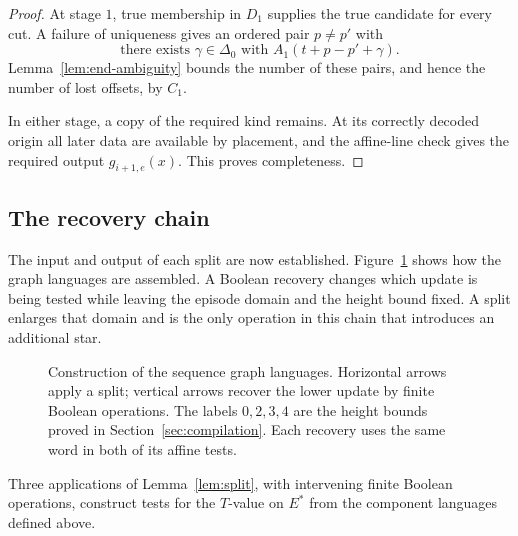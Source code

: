 \begin{proof}
At stage $1$, true membership in $D_1$ supplies the true candidate
for every cut.  A failure of uniqueness gives an ordered pair
$p\ne p'$ with
\[
 \text{there exists }\gamma\in\Delta_0
             \text{ with }A_1(t+p-p'+\gamma).
\]
Lemma~\ref{lem:end-ambiguity} bounds the number of these pairs,
and hence the number of lost offsets, by $C_1$.

In either stage, a copy of the required kind remains.  At its
correctly decoded origin all later data are available by placement,
and the affine-line check gives the required output
$g_{i+1,e}(x)$.  This proves completeness.
\end{proof}

\subsection{The recovery chain}

The input and output of each split are now established. Figure~\ref{fig:proof-stages}
shows how the graph languages are assembled. A Boolean recovery changes
which update is being tested while leaving the episode domain and the
height bound fixed. A split enlarges that domain and is the only operation
in this chain that introduces an additional star.

\begin{figure}[tbp]
\centering

\caption{Construction of the sequence graph languages. Horizontal arrows
apply a split; vertical arrows recover the lower update by finite Boolean
operations. The labels $0,2,3,4$ are the height bounds proved in
Section~\ref{sec:compilation}. Each recovery uses the same word in both
of its affine tests.}
\label{fig:proof-stages}
\end{figure}

\begin{proposition}
\label{prop:recursive-recovery}
Three applications of Lemma~\ref{lem:split}, with intervening finite
Boolean operations, construct tests for the $T$-value on $E^*$ from
the component languages defined above.
\end{proposition}

